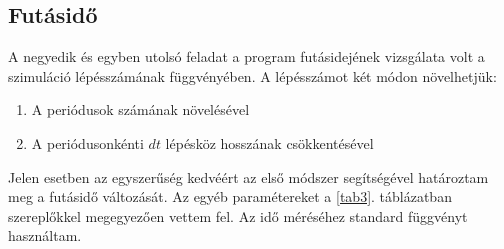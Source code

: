 \begin{multicols}{2}
\subsection{Futásidő}
A negyedik és egyben utolsó feladat a program futásidejének vizsgálata volt a szimuláció lépésszámának függvényében. A lépésszámot két módon növelhetjük:

\begin{enumerate}
    \item A periódusok számának növelésével
    \item A periódusonkénti $dt$ lépésköz hosszának csökkentésével
\end{enumerate}
Jelen esetben az egyszerűség kedvéért az első módszer segítségével határoztam meg a futásidő változását. Az egyéb paramétereket a \ref{tab3}. táblázatban szereplőkkel megegyezően vettem fel. Az idő méréséhez standard  függvényt használtam.

\end{multicols}
\hrulefill